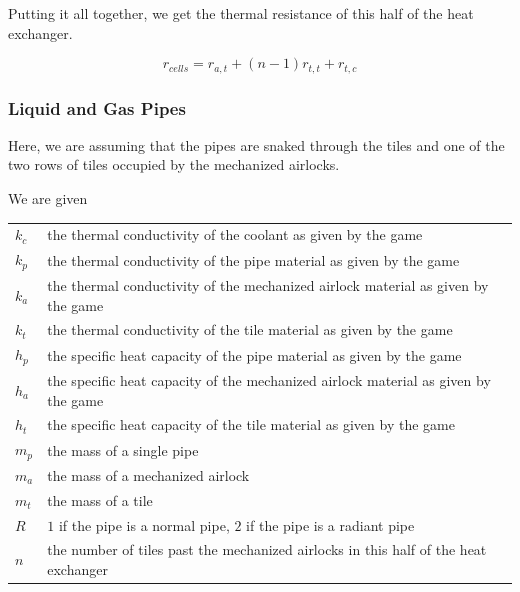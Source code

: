 \documentclass{article}
\numberwithin{equation}{subsection}
\theoremstyle{remark}
\newenvironment{definitiontable}{
\renewcommand{\arraystretch}{1.5}
\begin{tabular}{lp{0.8\textwidth}}
}
{
\end{tabular}
\renewcommand{\arraystretch}{1.0}
}
\begin{document}
Putting it all together, we get the thermal resistance of this half of the heat exchanger.

\begin{equation}
r_{cells} = r_{a,t} + \left(n - 1\right) r_{t,t} + r_{t,c}
\end{equation}

\subsubsection{Liquid and Gas Pipes}

Here, we are assuming that the pipes are snaked through the tiles and one of the two rows of tiles occupied by the mechanized airlocks.

We are given

\begin{definitiontable}
\(k_{c}\) & the thermal conductivity of the coolant as given by the game \\

\(k_{p}\) & the thermal conductivity of the pipe material as given by the game \\

\(k_{a}\) & the thermal conductivity of the mechanized airlock material as given by the game \\

\(k_{t}\) & the thermal conductivity of the tile material as given by the game \\

\(h_{p}\) & the specific heat capacity of the pipe material as given by the game \\

\(h_{a}\) & the specific heat capacity of the mechanized airlock material as given by the game \\

\(h_{t}\) & the specific heat capacity of the tile material as given by the game \\

\(m_{p}\) & the mass of a single pipe \\

\(m_{a}\) & the mass of a mechanized airlock \\

\(m_{t}\) & the mass of a tile \\

\(R\) & \(1\) if the pipe is a normal pipe, \(2\) if the pipe is a radiant pipe \\

\(n\) & the number of tiles past the mechanized airlocks in this half of the heat exchanger
\end{definitiontable}
\end{document}

